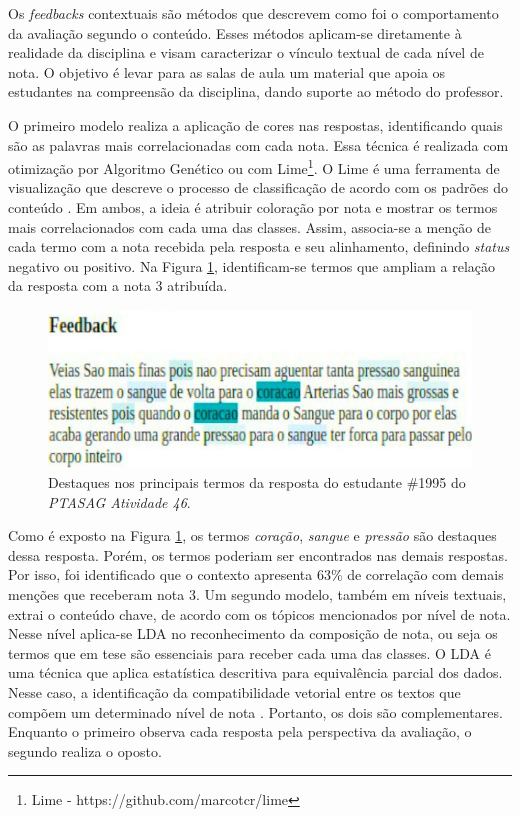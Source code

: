 Os \textit{feedbacks} contextuais são métodos que descrevem como foi o comportamento da avaliação segundo o conteúdo. Esses métodos aplicam-se diretamente à realidade da disciplina e visam caracterizar o vínculo textual de cada nível de nota. O objetivo é levar para as salas de aula um material que apoia os estudantes na compreensão da disciplina, dando suporte ao método do professor.

O primeiro modelo realiza a aplicação de cores nas respostas, identificando quais são as palavras mais correlacionadas com cada nota. Essa técnica é realizada com otimização por Algoritmo Genético \cite{spalenza2016a} ou com Lime\footnote{Lime - https://github.com/marcotcr/lime}. O Lime é uma ferramenta de visualização que descreve o processo de classificação de acordo com os padrões do conteúdo \cite{ribeiro2016}. Em ambos, a ideia é atribuir coloração por nota e mostrar os termos mais correlacionados com cada uma das classes. Assim, associa-se a menção de cada termo com a nota recebida pela resposta e seu alinhamento, definindo \textit{status} negativo ou positivo. Na Figura \ref{fig-highlight-46}, identificam-se termos que ampliam a relação da resposta com a nota 3 atribuída.

\begin{figure}[!h]
 \centering
 \includegraphics[width=.75\textwidth]{figuras/exemplo/highlight.jpeg}
 \caption{Destaques nos principais termos da resposta do estudante \#1995 do \textit{PTASAG Atividade 46}.}
 \label{fig-highlight-46}
\end{figure}

Como é exposto na Figura \ref{fig-highlight-46}, os termos \textit{coração}, \textit{sangue} e \textit{pressão} são destaques dessa resposta. Porém, os termos poderiam ser encontrados nas demais respostas. Por isso, foi identificado que o contexto apresenta 63\% de correlação com demais menções que receberam nota 3. Um segundo modelo, também em níveis textuais, extrai o conteúdo chave, de acordo com os tópicos mencionados por nível de nota. Nesse nível aplica-se LDA \cite{hoffman2013} no reconhecimento da composição de nota, ou seja os termos que em tese são essenciais para receber cada uma das classes. O LDA é uma técnica que aplica estatística descritiva para equivalência parcial dos dados. Nesse caso, a identificação da compatibilidade vetorial entre os textos que compõem um determinado nível de nota \cite{sahu2020}. Portanto, os dois são complementares. Enquanto o primeiro observa cada resposta pela perspectiva da avaliação, o segundo realiza o oposto. 

